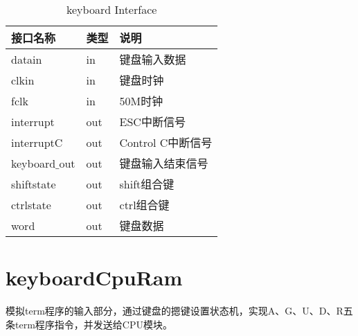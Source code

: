 \begin{table}[H]
\begin{center}
\renewcommand{\arraystretch}{1.3}
\small
\caption{keyboard Interface}
\label{tab:treatments}
\begin{tabular}{|p{3cm}<{\centering}|p{1.4cm}<{\centering}|p{7cm}<{\centering}|}
\hline
接口名称 & 类型 & 说明 \\
\hline
datain & in & 键盘输入数据 \\
\hline
clkin & in & 键盘时钟 \\
\hline
fclk & in & 50M时钟 \\
\hline
interrupt & out & ESC中断信号 \\
\hline
interruptC & out & Control C中断信号 \\
\hline
keyboard$\_$out & out & 键盘输入结束信号 \\
\hline
shiftstate & out & shift组合键 \\
\hline
ctrlstate & out & ctrl组合键\\
\hline
word & out & 键盘数据\\
\hline
\end{tabular}
\end{center}
\end{table}


\section{keyboardCpuRam}

模拟term程序的输入部分，通过键盘的摁键设置状态机，实现A、G、U、D、R五条term程序指令，并发送给CPU模块。

